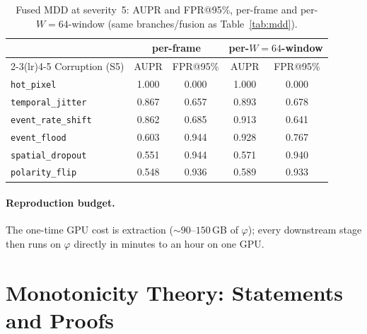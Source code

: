 ﻿\documentclass{article} %
\theoremstyle{remark}
\begin{document}
\begin{table}[H]
  \centering\small
  \begin{tabular}{lcccc}
    \toprule
    & \multicolumn{2}{c}{per-frame} & \multicolumn{2}{c}{per-$W{=}64$-window} \\
    \cmidrule(lr){2-3}\cmidrule(lr){4-5}
    Corruption (S5) & AUPR & FPR@95\% & AUPR & FPR@95\% \\
    \midrule
    \texttt{hot\_pixel}        & 1.000 & 0.000 & 1.000 & 0.000 \\
    \texttt{temporal\_jitter}  & 0.867 & 0.657 & 0.893 & 0.678 \\
    \texttt{event\_rate\_shift}& 0.862 & 0.685 & 0.913 & 0.641 \\
    \texttt{event\_flood}      & 0.603 & 0.944 & 0.928 & 0.767 \\
    \texttt{spatial\_dropout}  & 0.551 & 0.944 & 0.571 & 0.940 \\
    \texttt{polarity\_flip}    & 0.548 & 0.936 & 0.589 & 0.933 \\
    \bottomrule
  \end{tabular}
  \caption{Fused MDD at severity~5: AUPR and FPR@95\%, per-frame and per-$W{=}64$-window (same
  branches/fusion as Table~\ref{tab:mdd}).}
  \label{tab:mdd-aupr}
\end{table}

\paragraph{Reproduction budget.} The one-time GPU cost is extraction ($\sim\!90$--$150$\,GB of
$\varphi$); every downstream stage then runs on $\varphi$ directly in minutes to an hour on one GPU.

\section{Monotonicity Theory: Statements and Proofs}
\label{app:theory}
\end{document}
